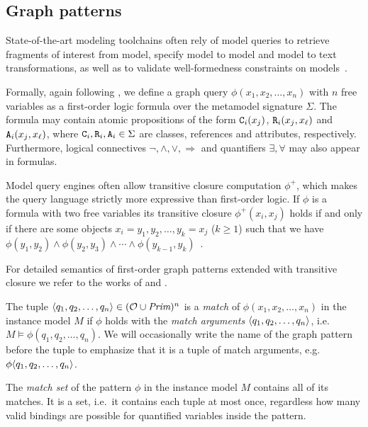 \subsection{Graph patterns}
\label{ssec:background:patterns}

State-of-the-art modeling toolchains often rely of model queries to retrieve fragments of interest from model, specify model to model and model to text transformations, as well as to validate well-formedness constraints on models~\citep{Bergmann11validation,Ujhelyi15incquery}.

Formally, again following \citet{Varro17generation}, we define a graph query \(\phi(x_1, x_2, \ldots, x_n)\) with \(n\) free variables as a first-order logic formula over the metamodel signature \(\Sigma\). The formula may contain atomic propositions of the form \(\texttt{\upshape C}_i(x_j)\), \(\texttt{\upshape R}_i(x_j, x_\ell)\) and \(\texttt{\upshape A}_i(x_j, x_\ell)\), where \(\texttt{\upshape C}_i, \texttt{\upshape R}_i, \texttt{\upshape A}_i \in \Sigma\) are classes, references and attributes, respectively. Furthermore, logical connectives \(\neg, \land, \lor, \Rightarrow\) and quantifiers \(\exists, \forall\) may also appear in formulas.

Model query engines often allow transitive closure computation \(\phi^+\), which makes the query language strictly more expressive than first-order logic. If \(\phi\) is a formula with two free variables its transitive closure \(\phi^+(x_i, x_j)\) holds if and only if there are some objects \(x_i = y_1, y_2, \ldots, y_k = x_j\) (\(k \ge 1\)) such that we have \(\phi(y_1, y_2) \land \phi(y_2, y_3) \land \cdots \land \phi(y_{k - 1}, y_k)\)~\citep{Bergmann12incscc}.

For detailed semantics of first-order graph patterns extended with transitive closure we refer to the works of \citet{Semerath17rewriting} and \citet{Varro17generation}.

The tuple \(\langle q_1, q_2, \ldots, q_n \rangle \in (\mathcal{O} \cup \textit{Prim})^n\) is a \emph{match} of \(\phi(x_1, x_2, \ldots, x_n)\) in the instance model \(M\) if \(\phi\) holds with the \emph{match arguments} \(\langle q_1, q_2, \ldots, q_n \rangle\), i.e.~\(M \vDash \phi(q_1, q_2, \ldots, q_n)\). We will occasionally write the name of the graph pattern before the tuple to emphasize that it is a tuple of match arguments, e.g.~\(\phi\langle q_1, q_2, \ldots, q_n\rangle\).

The \emph{match set} of the pattern \(\phi\) in the instance model \(M\) contains all of its matches. It is a set, i.e.~it contains each tuple at most once, regardless how many valid bindings are possible for quantified variables inside the pattern.

